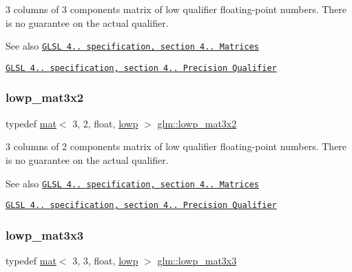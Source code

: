 3 columns of 3 components matrix of low qualifier floating-\/point numbers. There is no guarantee on the actual qualifier.

\begin{DoxySeeAlso}{See also}
\href{http://www.opengl.org/registry/doc/GLSLangSpec.4.20.8.pdf}{\tt G\+L\+SL 4.. specification, section 4.. Matrices} 

\href{http://www.opengl.org/registry/doc/GLSLangSpec.4.20.8.pdf}{\tt G\+L\+SL 4.. specification, section 4.. Precision Qualifier} 
\end{DoxySeeAlso}
\mbox{\label{group__core__precision_ga90265674cd36951273e63c70689d9a86}} 
\subsubsection{\texorpdfstring{lowp\+\_\+mat3x2}{lowp\_mat3x2}}
{\footnotesize\ttfamily typedef \mbox{\hyperlink{structglm_1_1mat}{mat}}$<$ 3, 2, float, \mbox{\hyperlink{namespaceglm_a36ed105b07c7746804d7fdc7cc90ff25ae161af3fc695e696ce3bf69f7332bc2d}{lowp}} $>$ \mbox{\hyperlink{group__core__precision_ga90265674cd36951273e63c70689d9a86}{glm\+::lowp\+\_\+mat3x2}}}

3 columns of 2 components matrix of low qualifier floating-\/point numbers. There is no guarantee on the actual qualifier.

\begin{DoxySeeAlso}{See also}
\href{http://www.opengl.org/registry/doc/GLSLangSpec.4.20.8.pdf}{\tt G\+L\+SL 4.. specification, section 4.. Matrices} 

\href{http://www.opengl.org/registry/doc/GLSLangSpec.4.20.8.pdf}{\tt G\+L\+SL 4.. specification, section 4.. Precision Qualifier} 
\end{DoxySeeAlso}
\mbox{\label{group__core__precision_ga6880ce658287c90c081aa60fa1f6f0a5}} 
\subsubsection{\texorpdfstring{lowp\+\_\+mat3x3}{lowp\_mat3x3}}
{\footnotesize\ttfamily typedef \mbox{\hyperlink{structglm_1_1mat}{mat}}$<$ 3, 3, float, \mbox{\hyperlink{namespaceglm_a36ed105b07c7746804d7fdc7cc90ff25ae161af3fc695e696ce3bf69f7332bc2d}{lowp}} $>$ \mbox{\hyperlink{group__core__precision_ga6880ce658287c90c081aa60fa1f6f0a5}{glm\+::lowp\+\_\+mat3x3}}}

